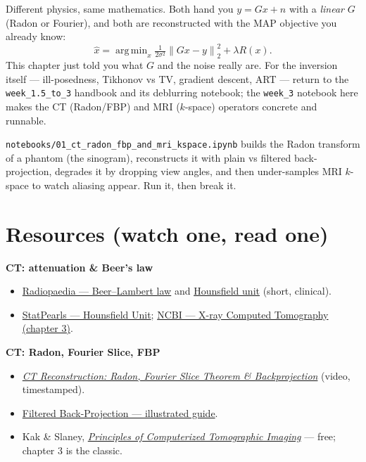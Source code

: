 \documentclass[11pt]{article}
\newcommand{\norm}[1]{\left\lVert #1 \right\rVert}
\DeclareMathOperator*{\argmin}{arg\,min}
\begin{document}
Different physics, same mathematics. Both hand you $y=Gx+n$ with a \emph{linear}
$G$ (Radon or Fourier), and both are reconstructed with the MAP objective you
already know:
\[
\hat{x}=\argmin_x \tfrac{1}{2\sigma^2}\norm{Gx-y}_2^2 + \lambda R(x).
\]
This chapter just told you what $G$ and the noise really are. For the inversion
itself --- ill-posedness, Tikhonov vs TV, gradient descent, ART --- return to the
\texttt{week\_1.5\_to\_3} handbook and its deblurring notebook; the
\texttt{week\_3} notebook here makes the CT (Radon/FBP) and MRI ($k$-space)
operators concrete and runnable.

\begin{keybox}
\texttt{notebooks/01\_ct\_radon\_fbp\_and\_mri\_kspace.ipynb} builds the Radon
transform of a phantom (the sinogram), reconstructs it with plain vs filtered
back-projection, degrades it by dropping view angles, and then under-samples MRI
$k$-space to watch aliasing appear. Run it, then break it.
\end{keybox}

\section*{Resources (watch one, read one)}

\textbf{CT: attenuation \& Beer's law}
\begin{itemize}[nosep,leftmargin=*]
  \item \href{https://radiopaedia.org/articles/beer-lambert-law-1}{Radiopaedia --- Beer--Lambert law} and \href{https://radiopaedia.org/articles/hounsfield-unit}{Hounsfield unit} (short, clinical).
  \item \href{https://www.ncbi.nlm.nih.gov/books/NBK547721/}{StatPearls --- Hounsfield Unit}; \href{https://www.ncbi.nlm.nih.gov/books/NBK232484/}{NCBI --- X-ray Computed Tomography (chapter 3)}.
\end{itemize}

\textbf{CT: Radon, Fourier Slice, FBP}
\begin{itemize}[nosep,leftmargin=*]
  \item \href{https://www.youtube.com/watch?v=65LMqRUaGo0}{\emph{CT Reconstruction: Radon, Fourier Slice Theorem \& Backprojection}} (video, timestamped).
  \item \href{https://howradiologyworks.com/filtered-backprojection-fbp-illustrated-guide-for-radiologic-technologists/}{Filtered Back-Projection --- illustrated guide}.
  \item Kak \& Slaney, \href{https://www.slaney.org/pct/}{\emph{Principles of Computerized Tomographic Imaging}} --- free; chapter 3 is the classic.
\end{itemize}
\end{document}
